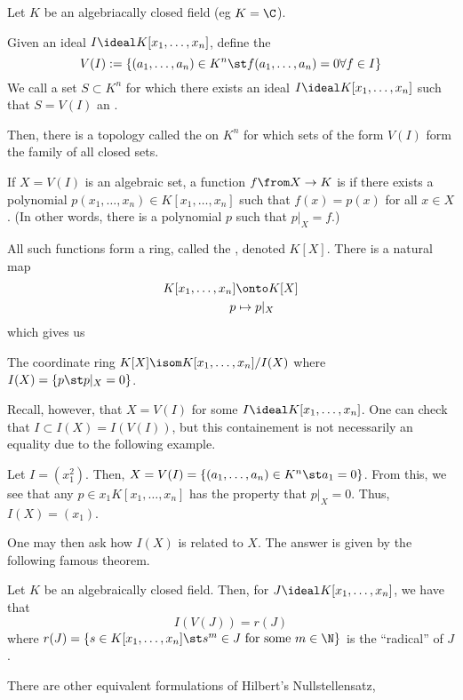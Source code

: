 \documentclass[11pt,leqno,oneside]{amsbook}
\numberwithin{thm}{section}
\begin{document}
Let \(K\) be an algebriacally closed field (eg \(K=\C\)).
\begin{defn}
  Given an ideal \(I \ideal K[x_1, \ldots, x_n]\), define the
   \[
    V(I) := \{(a_1, \ldots, a_n) \in K^n \st f(a_1, \ldots, a_n) = 0
    \forall f \in I\}
  \]
  We call a set \(S \subset K^n\) for which there exists an ideal \(I
  \ideal K[x_1, \ldots, x_n]\) such that \(S = V(I)\) an .
\end{defn}
Then, there is a topology called the  on \(K^n\)
for which sets of the form 
\(V(I)\) form the family of all closed sets.
\begin{defn}
  If \(X = V(I)\) is an algebraic set, a function \(f \from X \to K\)
  is  if there exists a polynomial \(p(x_1, \ldots, x_n)
  \in K[x_1, \ldots, x_n]\) such that \(f(x) = p(x)\) for all \(x \in
  X\). (In other words, there is a polynomial \(p\) such that \(p|_X =
  f\).)
\end{defn}
All such functions form a ring, called the ,
denoted \(K[X]\). There is a natural map
\begin{align*}
  K[x_1, \ldots, x_n] & \onto K[X] \\
  p & \mapsto p|_X
\end{align*}
which gives us
\begin{prop}
  The coordinate ring \(K[X] \isom K[x_1, \ldots, x_n]/I(X)\) where
  \(I(X) = \{p \st p|_X = 0\}\).
\end{prop}
Recall, however, that \(X = V(I)\) for some \(I \ideal K[x_1, \ldots,
x_n]\). One can check that \(I \subset I(X) = I(V(I))\), but this
containement is not necessarily an equality due to the following example.
\begin{example}
  Let \(I = (x_1^2)\). Then, \(X = V(I) = \{(a_1, \ldots, a_n) \in K^n \st
  a_1 = 0\}\). From this, we see that any \(p \in x_1 K[x_1, \ldots,
  x_n]\) has the property that \(p|_X = 0\). Thus, \(I(X) = (x_1)\).
\end{example}
One may then ask how \(I(X)\) is related to \(X\). The answer is given
by the following famous theorem.
\begin{thm}
  Let \(K\) be an algebraically closed field. Then, for \(J \ideal
  K[x_1, \ldots, x_n]\), we have that \[
    I(V(J)) = r(J)
  \]
  where \(r(J) = \{s \in K[x_1, \ldots, x_n] \st s^m
  \in J \text{ for some }m \in \N\}\) is the ``radical'' of \(J\).
\end{thm}
There are other equivalent formulations of Hilbert's Nullstellensatz,
\end{document}
